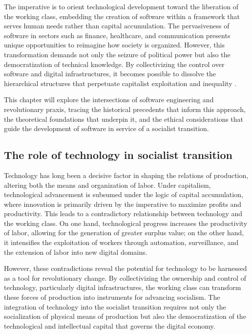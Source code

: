 \begin{refsection}
The imperative is to orient technological development toward the liberation of the working class, embedding the creation of software within a framework that serves human needs rather than capital accumulation. The pervasiveness of software in sectors such as finance, healthcare, and communication presents unique opportunities to reimagine how society is organized. However, this transformation demands not only the seizure of political power but also the democratization of technical knowledge. By collectivizing the control over software and digital infrastructures, it becomes possible to dissolve the hierarchical structures that perpetuate capitalist exploitation and inequality \cite[pp.~195]{lenin1947}.

This chapter will explore the intersections of software engineering and revolutionary praxis, tracing the historical precedents that inform this approach, the theoretical foundations that underpin it, and the ethical considerations that guide the development of software in service of a socialist transition.

\subsection{The role of technology in socialist transition}

Technology has long been a decisive factor in shaping the relations of production, altering both the means and organization of labor. Under capitalism, technological advancement is subsumed under the logic of capital accumulation, where innovation is primarily driven by the imperative to maximize profits and productivity. This leads to a contradictory relationship between technology and the working class. On one hand, technological progress increases the productivity of labor, allowing for the generation of greater surplus value; on the other hand, it intensifies the exploitation of workers through automation, surveillance, and the extension of labor into new digital domains.

However, these contradictions reveal the potential for technology to be harnessed as a tool for revolutionary change. By collectivizing the ownership and control of technology, particularly digital infrastructures, the working class can transform these forces of production into instruments for advancing socialism. The integration of technology into the socialist transition requires not only the socialization of physical means of production but also the democratization of the technological and intellectual capital that governs the digital economy.


\end{refsection}
